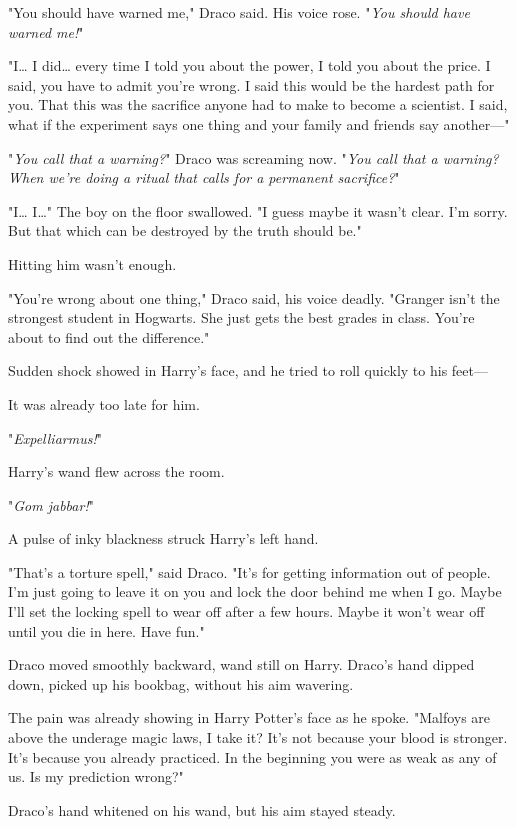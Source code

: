 "You should have warned me," Draco said. His voice rose. "\emph{You should have
warned me!}"

"I{\ldots} I did{\ldots} every time I told you about the power, I told you
about the price. I said, you have to admit you're wrong. I said this would be
the hardest path for you. That this was the sacrifice anyone had to make to
become a scientist. I said, what if the experiment says one thing and your
family and friends say another---"

"\emph{You call that a warning?}" Draco was screaming now. "\emph{You call that
a warning? When we're doing a ritual that calls for a permanent sacrifice?}"

"I{\ldots} I{\ldots}" The boy on the floor swallowed. "I guess maybe it wasn't
clear. I'm sorry. But that which can be destroyed by the truth should be."

Hitting him wasn't enough.

"You're wrong about one thing," Draco said, his voice deadly. "Granger isn't
the strongest student in Hogwarts. She just gets the best grades in class.
You're about to find out the difference."

Sudden shock showed in Harry's face, and he tried to roll quickly to his feet---

It was already too late for him.

"\emph{Expelliarmus!}"

Harry's wand flew across the room.

"\emph{Gom jabbar!}"

A pulse of inky blackness struck Harry's left hand.

"That's a torture spell," said Draco. "It's for getting information out of
people. I'm just going to leave it on you and lock the door behind me when I
go. Maybe I'll set the locking spell to wear off after a few hours. Maybe it
won't wear off until you die in here. Have fun."

Draco moved smoothly backward, wand still on Harry. Draco's hand dipped down,
picked up his bookbag, without his aim wavering.

The pain was already showing in Harry Potter's face as he spoke. "Malfoys are
above the underage magic laws, I take it? It's not because your blood is
stronger. It's because you already practiced. In the beginning you were as weak
as any of us. Is my prediction wrong?"

Draco's hand whitened on his wand, but his aim stayed steady.

